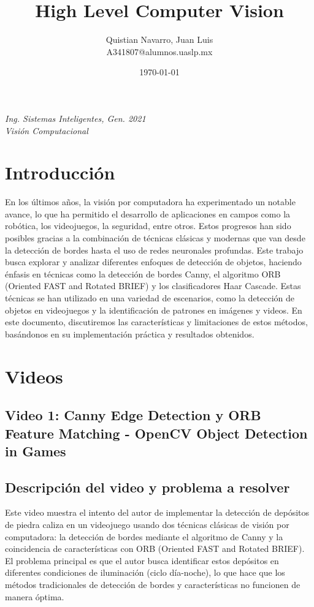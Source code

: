 \documentclass{article}
\title{High Level Computer Vision}
\author{
  \begin{minipage}[t]{0.4\linewidth}
    \centering
    Quistian Navarro, Juan Luis\\
    A341807@alumnos.uaslp.mx 
  \end{minipage}
}
\date{\today}
\begin{document}
\maketitle

\begin{minipage}{\textwidth}
  \centering
  \textit{Ing. Sistemas Inteligentes, Gen. 2021} \\
  \textit{Visión Computacional}
\end{minipage}

\small
\section*{Introducción}
En los últimos años, la visión por computadora ha experimentado un notable avance, lo que ha permitido el desarrollo de aplicaciones en campos como la robótica, los videojuegos, la seguridad, entre otros. Estos progresos han sido posibles gracias a la combinación de técnicas clásicas y modernas que van desde la detección de bordes hasta el uso de redes neuronales profundas. Este trabajo busca explorar y analizar diferentes enfoques de detección de objetos, haciendo énfasis en técnicas como la detección de bordes Canny, el algoritmo ORB (Oriented FAST and Rotated BRIEF) y los clasificadores Haar Cascade. Estas técnicas se han utilizado en una variedad de escenarios, como la detección de objetos en videojuegos y la identificación de patrones en imágenes y videos. En este documento, discutiremos las características y limitaciones de estos métodos, basándonos en su implementación práctica y resultados obtenidos.
\section{Videos}
\subsection*{Video 1: Canny Edge Detection y ORB Feature Matching - OpenCV Object Detection in Games}
\subsection*{Descripción del video y problema a resolver}
Este video muestra el intento del autor de implementar la detección de depósitos de piedra caliza en un videojuego usando dos técnicas clásicas de visión por computadora: la detección de bordes mediante el algoritmo de Canny y la coincidencia de características con ORB (Oriented FAST and Rotated BRIEF). El problema principal es que el autor busca identificar estos depósitos en diferentes condiciones de iluminación (ciclo día-noche), lo que hace que los métodos tradicionales de detección de bordes y características no funcionen de manera óptima.
\end{document}

